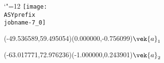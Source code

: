 \setlength{\unitlength}{1pt}%
\makeatletter%
\let\ASYencoding\f@encoding%
\let\ASYfamily\f@family%
\let\ASYseries\f@series%
\let\ASYshape\f@shape%
\makeatother%
{\catcode`"=12%
\texttt{[image: \\ASYprefix\\jobname-7\_0]}%
}%
%
%
\fontsize{8.000000}{9.600000}\selectfont%
\usefont{\ASYencoding}{\ASYfamily}{\ASYseries}{\ASYshape}%
\ASYalign(-49.536589,59.495054)(0.000000,-0.756099){$\vek{a}_1$}%
%
%
\fontsize{8.000000}{9.600000}\selectfont%
\ASYalign(-63.017771,72.976236)(-1.000000,0.243901){$\vek{a}_2$}%
